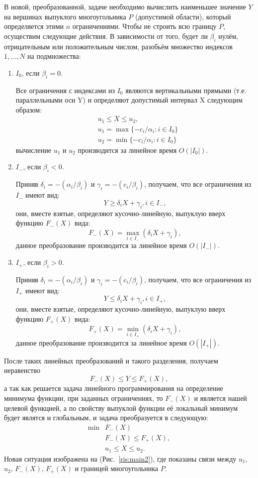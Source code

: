\documentclass[12pt,a4paper]{article}
\begin{document}
\newpage
В новой, преобразованной, задаче необходимо вычислить наименьшее значение $Y$ на вершинах выпуклого многоугольника $P$ (допустимой области), который определяется этими $n$ ограничениями. Чтобы не строить всю границу $P$, осуществим следующие действия. В зависимости от того, будет ли $\beta_{i}$ нулём, отрицательным или положительным числом, разобьём множество индексов $1,\dots,N$ на подмножества: 
\begin{enumerate}
\item $ I_{0}$, если $\beta_{i} = 0$.\par
Все ограничения с индексами из $ I_{0}$ являются вертикальными прямыми (т.е. параллельными оси Y) и определяют допустимый интервал X следующим образом:
\[
\begin{aligned}
&u_{1}\leqslant X \leqslant u_{2},\\
&u_{1}= \max\{-c_{i}/\alpha_{i}: i\in I_{0}\}\\
&u_{2}=\min \{-c_{i}/\alpha_{i}: i\in I_{0}\}
\end{aligned}
\]
вычисление $u_{1}$ и $u_{2}$ производится за линейное время $O(|I_{0}|)$.\par
\item $ I_{-}$, если $\beta_{i} < 0$.\par
Приняв $\delta_{i}=-(\alpha_{i}/\beta_{i})$ и $\gamma_{i}=-(c_{i}/\beta_{i})$, получаем, что все ограничения из $I_{-}$ имеют вид:
\[
Y\geqslant\delta_{i}X+\gamma_{i},  i\in I_{-},
\]
они, вместе взятые, определяют кусочно-линейную, выпуклую вверх функцию $F_{-}(X)$ вида:
\[
F_{-}(X)=\max_{ i\in I_{-}}(\delta_{i}X+\gamma_{i}),
\]
данное преобразование производится за линейное время $O(|I_{-}|)$.\par
\item $ I_{+}$, если $\beta_{i} > 0$. \par
Приняв $\delta_{i}=-(\alpha_{i}/\beta_{i})$ и $\gamma_{i}=-(c_{i}/\beta_{i})$, получаем, что все ограничения из $I_{+}$ имеют вид:
\[
Y\leqslant\delta_{i}X+\gamma_{i},  i\in I_{+},
\]
они, вместе взятые, определяют кусочно-линейную, выпуклую вверх функцию $F_{+}(X)$ вида:
\[
F_{+}(X)=\min_{ i\in I_{+}}(\delta_{i}X+\gamma_{i}),
\]
данное преобразование производится за линейное время $O(|I_{+}|)$.\par
\end{enumerate}



После таких линейных преобразований и такого разделения, получаем неравенство 
\[
F_{-}(X)\leqslant Y\leqslant F_{+}(X),
\]
а так как решается задача линейного программирования на определение минимума функции, при заданных ограничениях, то $F_{-}(X)$ и является нашей целевой функцией, а по свойству выпуклой функции её локальный минимум будет являтся и глобальным, и задача преобразуется в следующую:
\[
\begin{aligned}
	\min&  F_{-}(X) \\
	&F_{-}(X)\leqslant F_{+}(X),\\
	&u_{1}\leqslant X\leqslant u_{2}.
\end{aligned}
\]
Новая ситуация изображена на (Рис.~\ref{ris:main2}), где показаны связи между $u_{1}$, $u_{2}$, $F_{-}(X)$, $F_{+}(X)$ и границей многоугольника $P$.\par
\end{document}
